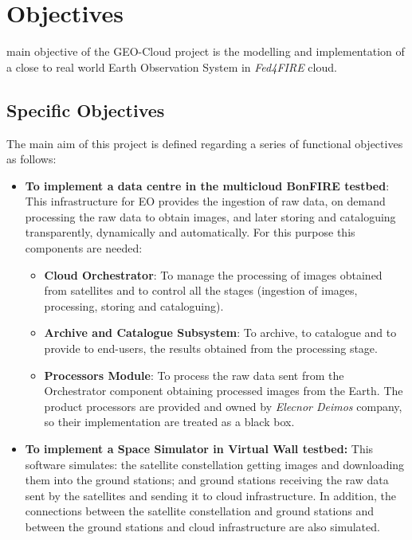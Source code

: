 \chapter{Objectives}
\label{chap:objetivos}
 main objective of the GEO-Cloud project is the modelling and
implementation of a close to real world Earth Observation System in
\emph{Fed4FIRE} cloud. 

\section{Specific Objectives}

The main aim of this project is defined regarding a series of functional
objectives as follows:
\begin{itemize}

\item {\textbf{To implement a data centre in the multicloud BonFIRE testbed}: This
  infrastructure for \ac{EO} provides the ingestion of raw data, on demand processing the raw
  data to obtain images, and later storing and cataloguing transparently,
  dynamically and automatically. For this purpose this components are needed:
}
\begin{itemize}

\item{\textbf{Cloud Orchestrator}: To manage the
  processing of images obtained from satellites and to control all the stages
  (ingestion of images, processing, storing and cataloguing).}
\item {\textbf{Archive and Catalogue Subsystem}: To archive, to catalogue and to
    provide to end-users, 
 the results obtained from the processing stage.}
\item{\textbf{Processors Module}: To process the raw data sent from
  the Orchestrator component obtaining processed images from the Earth. The product
  processors are provided and owned by \emph{Elecnor Deimos} company, so their implementation are treated as a black box.}
\end{itemize}

\item \textbf{To implement a Space Simulator in Virtual Wall testbed:} This
  software simulates: the satellite
  constellation getting images and downloading them into the ground stations; and ground
  stations receiving the raw data sent by the satellites and sending it to cloud
  infrastructure. In addition, the connections
  between the satellite constellation and ground stations and between the ground
  stations and cloud infrastructure are also simulated. 


\end{itemize}
